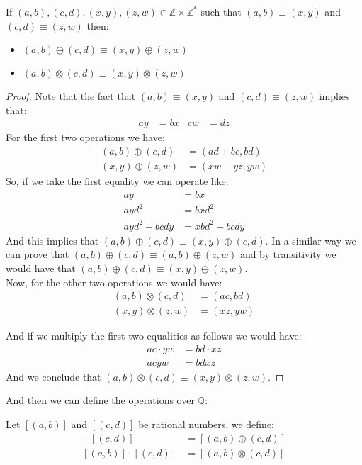 \documentclass{tufte-handout}
\begin{document}
\begin{theorem}
	If $(a, b), (c, d), (x, y), (z, w) \in \mathbb{Z} \times \mathbb{Z}^*$ such that $(a, b) \equiv (x, y)$ and $(c, d) \equiv (z, w)$ then:
	\begin{itemize}
		\item $(a, b) \oplus (c, d) \equiv (x, y) \oplus (z, w)$
		\item $(a, b) \otimes (c, d) \equiv (x, y) \otimes (z, w)$
	\end{itemize}
\end{theorem}
\begin{proof}
	Note that the fact that $(a, b) \equiv (x, y)$ and $(c, d) \equiv (z, w)$ implies that:
	\begin{align*}
		ay &= bx & cw &= dz
	\end{align*}
	For the first two operations we have:
	\begin{align*}
		(a, b) \oplus (c, d) &= (ad + bc, bd)\\
		(x, y) \oplus (z, w) &= (xw + yz, yw)
	\end{align*}
	So, if we take the first equality we can operate like:
	\begin{align*}
		ay &= bx\\
		ayd^2 &= bxd^2\\
		ayd^2 + bcdy &= xbd^2 + bcdy
	\end{align*}
	And this implies that $(a, b) \oplus (c, d) \equiv (x, y) \oplus (c, d)$. In a similar way we can prove that $(a, b) \oplus (c, d) \equiv (a, b) \oplus (z, w)$ and by transitivity we would have that $(a, b) \oplus (c, d) \equiv (x, y) \oplus (z, w)$.\\

	Now, for the other two operations we would have:
	\begin{align*}
		(a, b) \otimes (c, d) &= (ac, bd)\\
		(x, y) \otimes (z, w) &= (xz, yw)
	\end{align*}

	And if we multiply the first two equalities as follows we would have:
	\begin{align*}
		ac \cdot yw &= bd \cdot xz\\
		acyw &= bdxz
	\end{align*}
	And we conclude that $(a, b) \otimes (c, d) \equiv (x, y) \otimes (z, w)$.
\end{proof}

And then we can define the operations over $\mathbb{Q}$:
\begin{definition}
	Let $[(a, b)]$ and $[(c, d)]$ be rational numbers, we define:
	\begin{align*}
		[(a, b)] + [(c, d)] &= [(a, b) \oplus (c, d)]\\
		[(a, b)] \cdot [(c, d)] &= [(a, b) \otimes (c, d)]
	\end{align*}
\end{definition}
\end{document}

